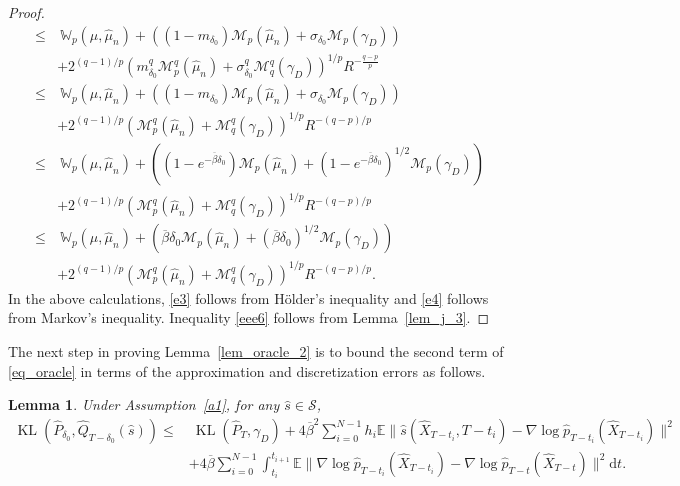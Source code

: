 \documentclass[12pts]{article}
\newtheorem{lemma}[defn]{Lemma}%
\newcommand{\diff}{\mathrm{d}}
\newcommand{\sM}{ \mathscr{M}}
\newcommand{\sS}{ \mathscr{S}}
\newcommand{\hP}{ \hat{P}}
\newcommand{\hQ}{ \hat{Q}}
\newcommand{\hX}{ \widehat{X}}
\newcommand{\hmu}{\hat{\mu}}
\newcommand{\E}{\mathbb{E}}
\newcommand{\fW}{\mathbb{W}}
\newcommand{\hp}{\hat{p}}
\newcommand{\kl}{\operatorname{KL}}
\begin{document}
\begin{proof}
\begin{align}
    \le & \ \fW_p(\mu, \hmu_n) +  \left( (1-m_{\delta_0}) \sM_p(\hmu_n) + \sigma_{\delta_0} \sM_p(\gamma_D) \right) \nonumber\\
    & + 2^{(q-1)/p} \left( m_{\delta_0}^q \sM_p^q(\hmu_n) +  \sigma_{\delta_0}^q \sM_q^q(\gamma_D) \right)^{1/p} R^{-\frac{q-p}{p}} \label{eee6}\\
    \le & \ \fW_p(\mu, \hmu_n) + \left( (1-m_{\delta_0}) \sM_p(\hmu_n) + \sigma_{\delta_0} \sM_p(\gamma_D) \right)  \nonumber\\
    & + 2^{(q-1)/p} \left( \sM_p^q(\hmu_n) +   \sM_q^q(\gamma_D) \right)^{1/p} R^{-(q-p)/p} \label{e5}\\
    \le & \ \fW_p(\mu, \hmu_n) +  \left( (1-e^{-\overline{\beta}\delta_0}) \sM_p(\hmu_n) + (1-e^{-\overline{\beta}\delta_0})^{1/2} \sM_p(\gamma_D) \right) \nonumber\\
    & + 2^{(q-1)/p} \left( \sM_p^q(\hmu_n) +   \sM_q^q(\gamma_D) \right)^{1/p} R^{-(q-p)/p} \nonumber\\
    \le & \ \fW_p(\mu, \hmu_n) +  \left( \overline{\beta}\delta_0 \sM_p(\hmu_n) + (\overline{\beta}\delta_0)^{1/2} \sM_p(\gamma_D) \right) \nonumber\\
    & + 2^{(q-1)/p} \left( \sM_p^q(\hmu_n) +   \sM_q^q(\gamma_D) \right)^{1/p} R^{-(q-p)/p}. \label{e6}
\end{align}
\endgroup
In the above calculations, \eqref{e3} follows from H\"older's inequality and \eqref{e4} follows from Markov's inequality. Inequality \eqref{eee6} follows from Lemma~\ref{lem_j_3}.
\end{proof}
The next step in proving Lemma~\ref{lem_oracle_2} is to bound the second term of \eqref{eq_oracle} in terms of the approximation and discretization errors as follows.
\begin{lemma}
\label{lem9}Under Assumption~\ref{a1}, for any $\hat{s} \in \sS$, 
    \begin{align}
        \kl(\hP_{\delta_0}, \hQ_{T-\delta_0
        }(\hat{s})) \le & \ \kl(\hP_T, \gamma_D) + 4 \overline{\beta}^2 \sum_{i=0}^{N-1} h_i \E \|\hat{s}(\hX_{T-t_i}, T-t_i) - \nabla \log \hp_{T-t_i}(\hX_{T-t_i})\|^2   \nonumber\\
  & +  4 \overline{\beta} \sum_{i=0}^{N-1}\int_{t_i}^{t_{i+1}} \E\|\nabla \log \hp_{T-t_i}(\hX_{T-t_i}) - \nabla \log \hp_{T-t}(\hX_{T-t})\|^2 \diff  t \label{e23}.
    \end{align}
\end{lemma}
\end{document}

